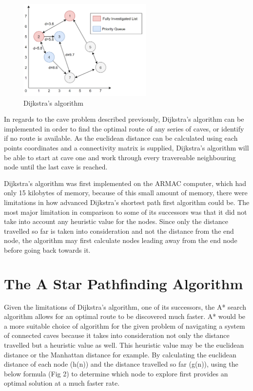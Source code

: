 \documentclass[10pt, a4paper]{article}
\newcommand{\figuremacro}[5]{
    \begin{figure}[#1]
        \centering
        \texttt{[image: \#2]}
        \caption[#3]{\textbf{#3}#4}
        \label{fig:#2}
    \end{figure}
}
\begin{document}

\begin{figure}
\includegraphics[height=5cm]{d.png}
\caption{Dijkstra's algorithm} \label{fig1}
\end{figure}

In regards to the cave problem described previously, Dijkstra's algorithm can be implemented in order to find the optimal route of any series of caves, or identify if no route is available. As the euclidean distance can be calculated using each points coordinates and a connectivity matrix is supplied, Dijkstra's algorithm will be able to start at cave one and work through every travereable neighbouring node until the last cave is reached.

Dijkstra's algorithm was first implemented on the ARMAC computer, which had only 15 kilobytes of memory, because of this small amount of memory, there were limitations in how advanced Dijkstra's shortest path first algorithm could be. The most major limitation in comparison to some of its successors was that it did not take into account any heuristic value for the nodes. Since only the distance travelled so far is taken into consideration and not the distance from the end node, the algorithm may first calculate nodes leading away from the end node before going back towards it.


\section{The A Star Pathfinding Algorithm}
Given the limitations of Dijkstra's algorithm, one of its successors, the A* search algorithm allows for an optimal route to be discovered much faster.  A* would be a more suitable choice of algorithm for the given problem of navigating a system of connected caves because it takes into consideration not only the distance travelled but a heuristic value as well. This heuristic value may be the euclidean distance or the Manhattan distance for example. By calculating the euclidean distance of each node (h(n)) and the distance travelled so far (g(n)), using the below formula (Fig 2) to determine which node to explore first provides an optimal solution at a much faster rate.
\end{document}
